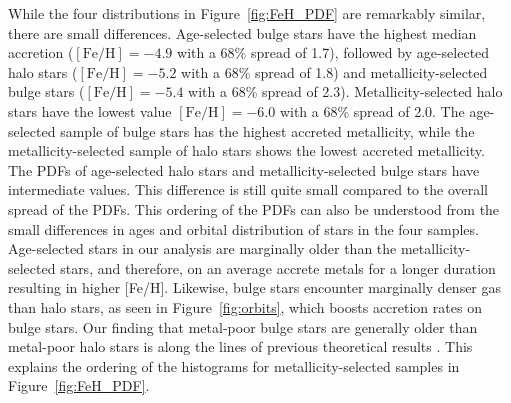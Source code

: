\documentclass[a4paper,fleqn,usenatbib]{mnras}
\begin{document}
While the four distributions in Figure~\ref{fig:FeH_PDF} are
remarkably similar, there are small differences.  Age-selected bulge
stars have the highest median accretion
($[\mathrm{Fe}/\mathrm{H}]=-4.9$ with a 68\% spread of 1.7), followed
by age-selected halo stars ($[\mathrm{Fe}/\mathrm{H}]=-5.2$ with a
68\% spread of 1.8) and metallicity-selected bulge stars
($[\mathrm{Fe}/\mathrm{H}]=-5.4$ with a 68\% spread of 2.3).
Metallicity-selected halo stars have the lowest value
$[\mathrm{Fe}/\mathrm{H}]=-6.0$ with a 68\% spread of 2.0.  The
age-selected sample of bulge stars has the highest accreted
metallicity, while the metallicity-selected sample of halo stars shows
the lowest accreted metallicity.  The PDFs of age-selected halo stars
and metallicity-selected bulge stars have intermediate values.  This
difference is still quite small compared to the overall spread of the
PDFs.  This ordering of the PDFs can also be understood from the small
differences in ages and orbital distribution of stars in the four
samples.  Age-selected stars in our analysis are marginally older than
the metallicity-selected stars, and therefore, on an average accrete
metals for a longer duration resulting in higher [Fe/H].  Likewise,
bulge stars encounter marginally denser gas than halo stars, as seen
in Figure~\ref{fig:orbits}, which boosts accretion rates on bulge
stars.  Our finding that metal-poor bulge stars are generally older
than metal-poor halo stars is along the lines of previous theoretical
results \citep{2000fist.conf..327W, 2007ApJ...661...10B,
  2010ApJ...708.1398T}.  This explains the ordering of the histograms
for metallicity-selected samples in Figure~\ref{fig:FeH_PDF}.
\end{document}
